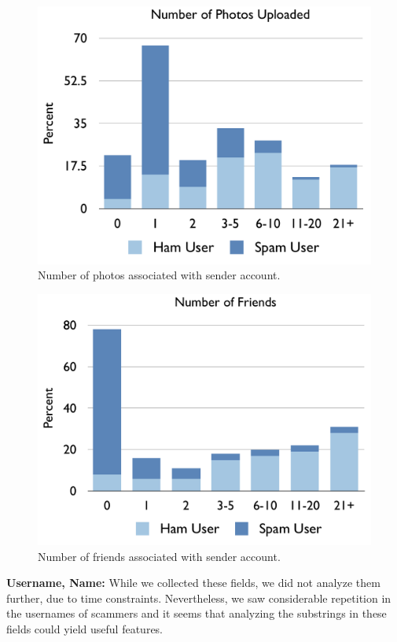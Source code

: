 \documentclass[preprint]{acm_proc_article-sp}
\begin{document}
\begin{figure}[h]
    \centering
    \includegraphics[width=\linewidth]{figures/photos.pdf}
    \caption{Number of photos associated with sender account.}
    \label{fig:photos}
\end{figure}

\begin{figure}[h]
    \centering
    \includegraphics[width=\linewidth]{figures/friends.pdf}
    \caption{Number of friends associated with sender account.}
    \label{fig:friends}
\end{figure}

\textbf{Username, Name:} While we collected these fields, we did not analyze them further, due to 
time constraints. Nevertheless, we saw considerable repetition in the usernames of scammers 
and it seems that analyzing the substrings in these fields could yield useful features.
\end{document}
